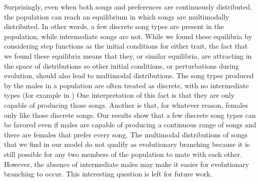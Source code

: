 \documentclass[12pt]{article}
\begin{document}
Surprisingly, even when both songs and preferences are continuously distributed, the population can reach an equilibrium in which songs are multimodally distributed. In other words, a few discrete song types are present in the population, while intermediate songs are not. While we found these equilibria by considering step functions as the initial conditions for either trait, the fact that we found these equilibria means that they, or similar equilibria, are attracting in the space of distributions so other initial conditions, or perturbations during evolution, should also lead to multimodal distributions. The song types produced by the males in a population are often treated as discrete, with no intermediate types (for example in \cite{Gibbs:1990fk,Devoogd:1993uq}) One interpretation of this fact is that they are only capable of producing those songs. Another is that, for whatever reason, females only like those discrete songs. Our results show that a few discrete song types can be favored even if males are capable of producing a continuous range of songs and there are females that prefer every song.
The multimodal distributions of songs that we find in our model do not qualify as evolutionary branching because it is still possible for any two members of the population to mate with each other. However, the absence of intermediate males may make it easier for evolutionary branching to occur. This interesting question is left for future work. 
 
\end{document}
